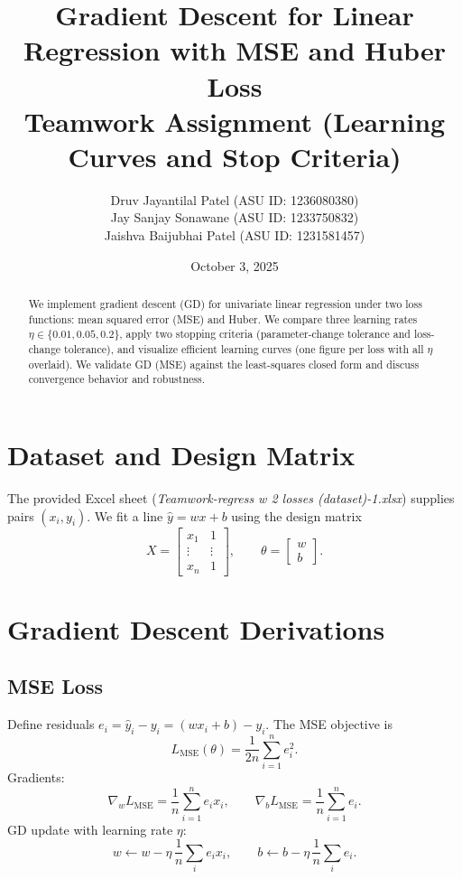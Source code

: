 \documentclass[11pt]{article}
\title{Gradient Descent for Linear Regression with MSE and Huber Loss\\
\large Teamwork Assignment (Learning Curves and Stop Criteria)}
\author{
  Druv Jayantilal Patel (ASU ID: 1236080380)\\
  Jay Sanjay Sonawane (ASU ID: 1233750832)\\
  Jaishva Baijubhai Patel (ASU ID: 1231581457)
}
\date{October 3, 2025}
\begin{document}
\maketitle

\begin{abstract}
We implement gradient descent (GD) for univariate linear regression under two loss functions: mean squared error (MSE) and Huber. We compare three learning rates $\eta\in\{0.01, 0.05, 0.2\}$, apply two stopping criteria (parameter-change tolerance and loss-change tolerance), and visualize efficient learning curves (one figure per loss with all $\eta$ overlaid). We validate GD (MSE) against the least-squares closed form and discuss convergence behavior and robustness.
\end{abstract}

\section{Dataset and Design Matrix}
The provided Excel sheet (\emph{Teamwork-regress w 2 losses (dataset)-1.xlsx}) supplies pairs $(x_i,y_i)$. We fit a line $\hat y = w x + b$ using the design matrix
\[
X=\begin{bmatrix}
x_1 & 1\\
\vdots & \vdots\\
x_n & 1
\end{bmatrix},\qquad
\theta=\begin{bmatrix} w\\ b \end{bmatrix}.
\]

\section{Gradient Descent Derivations}
\subsection{MSE Loss}
Define residuals $e_i=\hat y_i-y_i = (wx_i+b)-y_i$. The MSE objective is
\[
L_{\mathrm{MSE}}(\theta)=\frac{1}{2n}\sum_{i=1}^n e_i^2.
\]
Gradients:
\[
\nabla_w L_{\mathrm{MSE}}=\frac{1}{n}\sum_{i=1}^n e_i x_i,\qquad
\nabla_b L_{\mathrm{MSE}}=\frac{1}{n}\sum_{i=1}^n e_i.
\]
GD update with learning rate $\eta$:
\[
w \leftarrow w - \eta \,\frac{1}{n}\sum_i e_i x_i,\qquad
b \leftarrow b - \eta \,\frac{1}{n}\sum_i e_i.
\]
\end{document}
